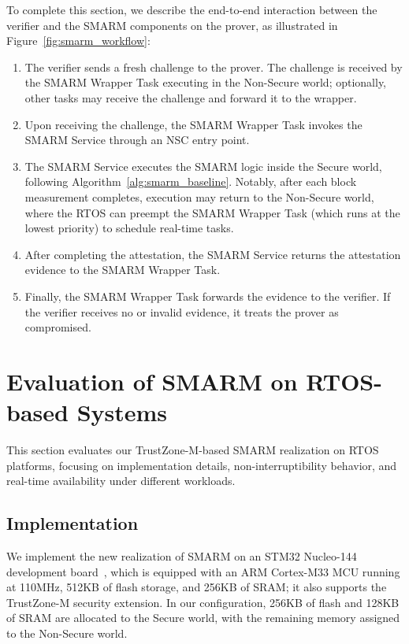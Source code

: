 \documentclass{ieeeaccess}
\begin{document}
To complete this section, we describe the end-to-end interaction between the verifier and the SMARM components on the prover, as illustrated in Figure~\ref{fig:smarm_workflow}:

\begin{enumerate}
    \item The verifier sends a fresh challenge to the prover. The challenge is received by the SMARM Wrapper Task executing in the Non-Secure world; optionally, other tasks may receive the challenge and forward it to the wrapper.
    
    \item Upon receiving the challenge, the SMARM Wrapper Task invokes the SMARM Service through an NSC entry point.
    
    \item The SMARM Service executes the SMARM logic inside the Secure world, following Algorithm~\ref{alg:smarm_baseline}.
    Notably, after each block measurement completes, execution may return to the Non-Secure world, where the RTOS can preempt the SMARM Wrapper Task (which runs at the lowest priority) to schedule real-time tasks.

    \item After completing the attestation, the SMARM Service returns the attestation evidence to the SMARM Wrapper Task.
    
    \item Finally, the SMARM Wrapper Task forwards the evidence to the verifier. If the verifier receives no or invalid evidence, it treats the prover as compromised.
\end{enumerate}



\section{Evaluation of SMARM on RTOS-based Systems}
\label{sec:evaluation}

This section evaluates our TrustZone-M-based SMARM realization on RTOS platforms, focusing on implementation details, non-interruptibility behavior, and real-time availability under different workloads.

\subsection{Implementation}

We implement the new realization of SMARM on an STM32 Nucleo-144 development board~\cite{stm32l552_nucleo144}, which is equipped with an ARM Cortex-M33 MCU running at 110MHz, 512KB of flash storage, and 256KB of SRAM;
it also supports the TrustZone-M security extension.
In our configuration, 256KB of flash and 128KB of SRAM are allocated to the Secure world, with the remaining memory assigned to the Non-Secure world.
\end{document}
